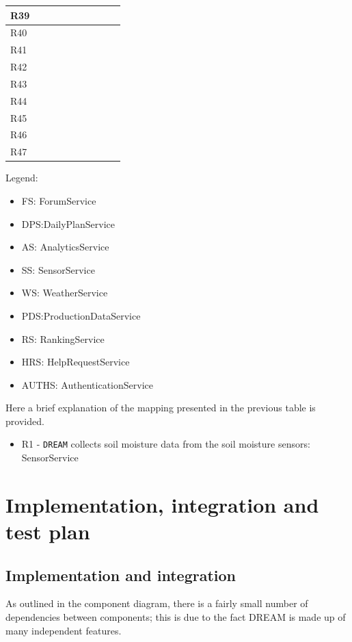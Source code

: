 \documentclass{article}
\begin{document}
\begin{longtable}[c]{|m{0.15cm}|m{0.15cm}|m{0.15cm}|m{0.15cm}|m{0.15cm}|m{0.15cm}|m{0.15cm}|m{0.15cm}|m{0.15cm}|m{0.15cm}|}
 \hline
 R39 &   &   &   &   &   &   &  &   &     \\
 \hline
 R40 &   &   &   &   &   &   &  &   &     \\
 \hline
 R41 &   &   &   &   &   &   &  &   &      \\
 \hline
 R42 &   &   &   &   &   &   &  &   &      \\
 \hline
 R43 &   &   &   &   &   &   &  &   &      \\
 \hline
 R44 &   &   &   &   &   &   &  &   &      \\
 \hline
 R45 &   &   &   &   &   &   &  &   &      \\
 \hline
 R46 &   &   &   &   &   &   &  &   &      \\
 \hline
 R47 &   &   &   &   &   &   &  &   &      \\
 \hline
\end{longtable}

Legend:
\begin{itemize}
    \item FS: ForumService
    \item DPS:DailyPlanService
    \item AS: AnalyticsService
    \item SS: SensorService
    \item WS: WeatherService
    \item PDS:ProductionDataService
    \item RS: RankingService
    \item HRS: HelpRequestService
    \item AUTHS: AuthenticationService
\end{itemize}

Here a brief explanation of the mapping presented in the previous table is provided.

\begin{itemize}
    \item R1 - \verb|DREAM| collects soil moisture data from the soil moisture sensors: SensorService
\end{itemize}

\newpage
\section{Implementation, integration and test plan}
\subsection{Implementation and integration}
\setlength{\parskip}{.5em}
As outlined in the component diagram, there is a fairly small number of dependencies between components; this is due to the fact DREAM is made up of many independent features.
\end{document}

